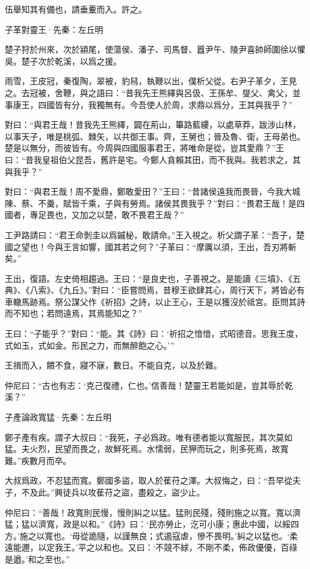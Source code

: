 \documentclass[12pt,a4paper]{ctexbook}
\begin{document}
伍舉知其有備也，請垂櫜而入。許之。\par
子革對靈王·先秦：左丘明 \par
楚子狩於州來，次於潁尾，使蕩侯、潘子、司馬督、囂尹午、陵尹喜帥師圍徐以懼吳。楚子次於乾溪，以爲之援。\par
雨雪，王皮冠，秦復陶，翠被，豹舄，執鞭以出，僕析父從。右尹子革夕，王見之。去冠被，舍鞭，與之語曰：“昔我先王熊繹與呂伋、王孫牟、燮父、禽父，並事康王，四國皆有分，我獨無有。今吾使人於周，求鼎以爲分，王其與我乎？”\par
對曰：“與君王哉！昔我先王熊繹，闢在荊山，篳路藍縷，以處草莽，跋涉山林，以事天子，唯是桃弧、棘矢，以共御王事。齊，王舅也；晉及魯、衛，王母弟也。楚是以無分，而彼皆有。今周與四國服事君王，將唯命是從，豈其愛鼎？”王曰：“昔我皇祖伯父昆吾，舊許是宅。今鄭人貪賴其田，而不我與。我若求之，其與我乎？”\par
對曰：“與君王哉！周不愛鼎，鄭敢愛田？”王曰：“昔諸侯遠我而畏晉，今我大城陳、蔡、不羹，賦皆千乘，子與有勞焉。諸侯其畏我乎？”對曰：“畏君王哉！是四國者，專足畏也，又加之以楚，敢不畏君王哉？”\par
工尹路請曰：“君王命剝圭以爲鏚柲，敢請命。”王入視之。析父謂子革：“吾子，楚國之望也！今與王言如響，國其若之何？”子革曰：“摩厲以須，王出，吾刃將斬矣。”\par
王出，復語。左史倚相趨過。王曰：“是良史也，子善視之。是能讀《三墳》、《五典》、《八索》、《九丘》。”對曰：“臣嘗問焉，昔穆王欲肆其心，周行天下，將皆必有車轍馬跡焉。祭公謀父作《祈招》之詩，以止王心，王是以獲沒於祗宮。臣問其詩而不知也；若問遠焉，其焉能知之？”\par
王曰：“子能乎？”對曰：“能。其《詩》曰：‘祈招之愔愔，式昭德音。思我王度，式如玉，式如金。形民之力，而無醉飽之心。’”\par
王揖而入，饋不食，寢不寐，數日。不能自克，以及於難。\par
仲尼曰：“古也有志：‘克己復禮，仁也。’信善哉！楚靈王若能如是，豈其辱於乾溪？”\par
子產論政寬猛·先秦：左丘明 \par
鄭子產有疾。謂子大叔曰：“我死，子必爲政。唯有德者能以寬服民，其次莫如猛。夫火烈，民望而畏之，故鮮死焉。水懦弱，民狎而玩之，則多死焉，故寬難。”疾數月而卒。\par
大叔爲政，不忍猛而寬。鄭國多盜，取人於萑苻之澤。大叔悔之，曰：“吾早從夫子，不及此。”興徒兵以攻萑苻之盜，盡殺之，盜少止。\par
仲尼曰：“善哉！政寬則民慢，慢則糾之以猛。猛則民殘，殘則施之以寬。寬以濟猛；猛以濟寬，政是以和。”《詩》曰：‘民亦勞止，汔可小康；惠此中國，以綏四方。’施之以寬也。‘毋從詭隨，以謹無良；式遏寇虐，慘不畏明。’糾之以猛也。‘柔遠能邇，以定我王。’平之以和也。又曰：‘不競不絿，不剛不柔，佈政優優，百祿是遒。’和之至也。”\par
\end{document}
